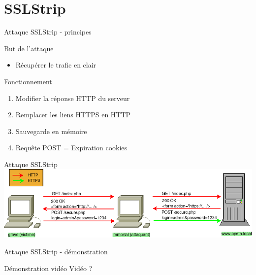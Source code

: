 \section{SSLStrip}


\begin{frame}[fragile]{Attaque SSLStrip - principes}
  \begin{block}{But de l'attaque}
    \begin{itemize}
    \item Récupérer le trafic en clair
    \end{itemize}
  \end{block}
  \begin{block}{Fonctionnement}
    \begin{enumerate}
      \item Modifier la réponse HTTP du serveur
      \item Remplacer les liens HTTPS en HTTP
      \item Sauvegarde en mémoire
      \item Requête POST = Expiration cookies
    \end{enumerate}
  \end{block}
\end{frame}


\begin{frame}{Attaque SSLStrip}
    \includegraphics[width=\linewidth]{../medias/sslstrip/attack.png}
\end{frame}


\begin{frame}{Attaque SSLStrip - démonstration}
  \begin{block}{Démonstration vidéo}
    Vidéo ?
  \end{block}
\end{frame}

